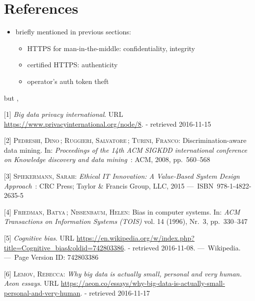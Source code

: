 \documentclass[12pt,english,a4paper,titlepage,cleardoublepage=empty,dottedtoc]{report}
\providecommand{\tightlist}{%
  \setlength{\itemsep}{0pt}\setlength{\parskip}{0pt}}
\begin{document}
\chapter*{References}\label{references}

\begin{itemize}
\tightlist
\item
  briefly mentioned in previous sections:

  \begin{itemize}
  \tightlist
  \item
    HTTPS for man-in-the-middle: confidentiality, integrity
  \item
    certified HTTPS: authenticity
  \item
    operator's auth token theft
  \end{itemize}
\end{itemize}

but ,

\hypertarget{refs}{}
\hypertarget{ref-web_2016_privacy-international-about-big-data}{}
{[}1{]} \emph{Big data privacy international}. URL
\url{https://www.privacyinternational.org/node/8}. - retrieved
2016-11-15

\hypertarget{ref-paper_2008_discrimination-aware-data-mining}{}
{[}2{]} \textsc{Pedreshi, Dino}\,; \textsc{Ruggieri, Salvatore}\,;
\textsc{Turini, Franco}: Discrimination-aware data mining. In:
\emph{Proceedings of the 14th ACM SIGKDD international conference on
Knowledge discovery and data mining}~: ACM, 2008, pp.~560--568

\hypertarget{ref-book_2015_ethical-it-innovation}{}
{[}3{]} \textsc{Spiekermann, Sarah}: \emph{Ethical IT Innovation: A
Value-Based System Design Approach}~: CRC Press; Taylor \& Francis
Group, LLC, 2015 ---~ISBN~978-1-4822-2635-5

\hypertarget{ref-paper_1996_bias-in-computer-systems}{}
{[}4{]} \textsc{Friedman, Batya}\,; \textsc{Nissenbaum, Helen}: Bias in
computer systems. In: \emph{ACM Transactions on Information Systems
(TOIS)} vol. 14 (1996), Nr.~3, pp.~330--347

\hypertarget{ref-wikipedia_2016_cognitive-bias}{}
{[}5{]} \emph{Cognitive bias}. URL
\url{https://en.wikipedia.org/w/index.php?title=Cognitive_bias\&oldid=742803386}.
- retrieved 2016-11-08. ---~Wikipedia. ---~Page Version ID: 742803386

\hypertarget{ref-web_2016_big-data-is-people}{}
{[}6{]} \textsc{Lemov, Rebecca}: \emph{Why big data is actually small,
personal and very human. Aeon essays}. URL
\url{https://aeon.co/essays/why-big-data-is-actually-small-personal-and-very-human}.
- retrieved 2016-11-17
\end{document}
